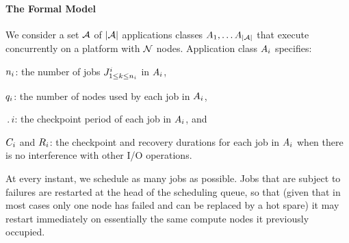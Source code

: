 \paragraph*{The Formal Model}
We consider a set ${\mathcal A}$ of $|{\mathcal A}|$ applications classes
$A_{1}, \ldots A_{|{\mathcal A}|}$ that execute concurrently on a platform with
${\mathcal N}$ nodes. Application class $A_{i}$ specifies:
\begin{compactitem}
\item $n_{i}$: the number of jobs $J^{i}_{1 \leq k\leq n_{i}}$ in $A_{i}$,
\item $q_{i}$: the number of nodes used by each job in $A_{i}$,
\item $\period{i}$: the checkpoint period of each job in $A_{i}$, and
\item $C_{i}$ and $R_{i}$: the checkpoint and recovery durations for each job in $A_{i}$ when there is no interference with other I/O operations.
\end{compactitem}
At every instant, we schedule as many jobs as possible.
Jobs that are subject to failures are restarted at the head of
the scheduling queue, so that (given that in most cases only one
node has failed and can be replaced by a hot spare) it may restart
immediately on essentially the same compute nodes it previously occupied.

